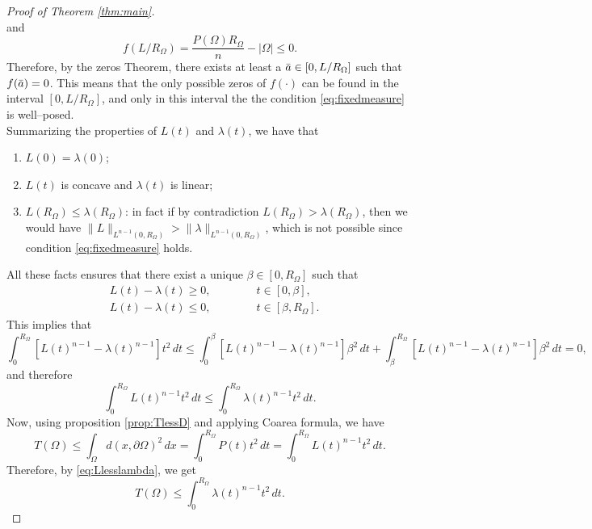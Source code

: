 \documentclass[oneside,a4paper,11pt,notitlepage]{article}
\newcommand{\abs}[1]{{\left|#1\right|}}
\theoremstyle{definition}
\theoremstyle{plain}
\theoremstyle{definition}
\begin{document}
\begin{proof}[Proof of Theorem \ref{thm:main}]
\begin{equation*}
\end{equation*}
and
\begin{equation*}
    f(L/R_\Omega) = \frac{P(\Omega)R_\Omega}{n}-\abs{\Omega}\le 0.
\end{equation*}
Therefore, by the zeros Theorem, there exists at least a $\Bar{a}\in [0, L/R_\Omega]$ such that $f(\Bar{a})=0$. This means that the only possible zeros of $f(\cdot)$ can be found in the interval $[0,L/R_\Omega]$, and only in this interval the the condition \eqref{eq:fixedmeasure} is well--posed. \\
Summarizing the properties of  $L(t)$ and $\lambda(t)$, we have that
\begin{enumerate}
\item $L(0)=\lambda(0)$;
    \item $L(t)$ is concave and $\lambda(t)$ is linear;
    \item $L(R_\Omega)\le \lambda (R_\Omega)$: in fact if by contradiction $L(R_\Omega)>\lambda(R_\Omega)$, then we would have $\|L\|_{L^{n-1}(0,R_\Omega)}> \|\lambda\|_{L^{n-1}(0,R_\Omega)}$, which is not possible since condition \eqref{eq:fixedmeasure} holds.
\end{enumerate} 
All these facts ensures that there exist a unique $\beta \in [0,R_\Omega]$ such that
\begin{align*}
    &L(t)-\lambda(t)\ge 0, \qquad\qquad t\in [0,\beta],\\
    &L(t)-\lambda(t)\le 0, \qquad\qquad t\in [\beta,R_\Omega].
\end{align*}
This implies that
\begin{equation*}
    \int_{0}^{R_\Omega}[L(t)^{n-1}-\lambda(t)^{n-1}]t^2\,dt \le \int_{0}^{\beta}[L(t)^{n-1}-\lambda(t)^{n-1}]\beta^2\,dt+\int_{\beta}^{R_\Omega}[L(t)^{n-1}-\lambda(t)^{n-1}]\beta^2\,dt= 0,
\end{equation*}
and therefore
\begin{equation}\label{eq:Llesslambda}
    \int_0^{R_\Omega}L(t)^{n-1}t^2\,dt\le \int_0^{R_\Omega}\lambda(t)^{n-1}t^2\,dt.
\end{equation}
Now, using proposition \ref{prop:TlessD} and applying Coarea formula, we have
\begin{equation*}
    T(\Omega)\le \int_{\Omega}d(x,\partial \Omega)^2\,dx = \int_0^{R_\Omega}P(t)t^2\,dt = \int_{0}^{R_\Omega}L(t)^{n-1}t^2\,dt.
\end{equation*}
Therefore, by \eqref{eq:Llesslambda}, we get
\begin{equation}\label{eq:Tlesslambda}
    T(\Omega) \le \int_{0}^{R_\Omega}\lambda(t)^{n-1}t^2\,dt.

\end{equation}
\end{proof}
\end{document}
